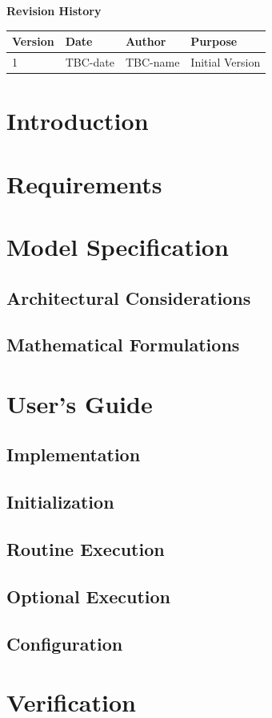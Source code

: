 \documentclass[11pt,fleqn]{report}
\begin{document}
\titlePage
\clearpage %
\tableofcontents %
\vfill
{\Large \textbf {Revision History}}
{\large
\begin{center}
\begin{tabular}{|l||l|l|l|}
\hline
 \textbf{Version} & \textbf{Date} & \textbf{Author} & \textbf{Purpose} \\ \hline
 \hline
1 & TBC-date & TBC-name & Initial Version \\ \hline
\end{tabular}
\end{center}
}

\chapter{Introduction} %

\chapter {Requirements}

\chapter {Model Specification}
\section {Architectural Considerations}
\section {Mathematical Formulations}

\chapter {User's Guide}
\section {Implementation}
\section {Initialization}
\section {Routine Execution}
\section {Optional Execution}
\section {Configuration}

\chapter{Verification}
\end{document}

